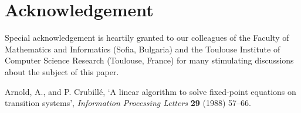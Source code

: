 \documentclass[draft]{article}
\def\S{\mathbf{S}}
\def\LTL{\mathbf{LTL}}
\begin{document}
\section*{Acknowledgement}
%
%
Special acknowledgement is heartily granted to our colleagues of the Faculty of Mathematics and Informatics (Sofia, Bulgaria) and the Toulouse Institute of Computer Science Research (Toulouse, France) for many stimulating discussions about the subject of this paper.
%
%
%
%

%
%
\begin{thebibliography}{}
%
%
{\sc Arnold,} A., and P. {\sc Crubill\'e,}
`A linear algorithm to solve fixed-point equations on transition systems',
\emph{Information Processing Letters}\/ {\bf 29} (1988) 57--66.
%
%
%
%
%
%
%
%
%
%
%
%
%
%
%
%

\end{thebibliography}
\end{document}
